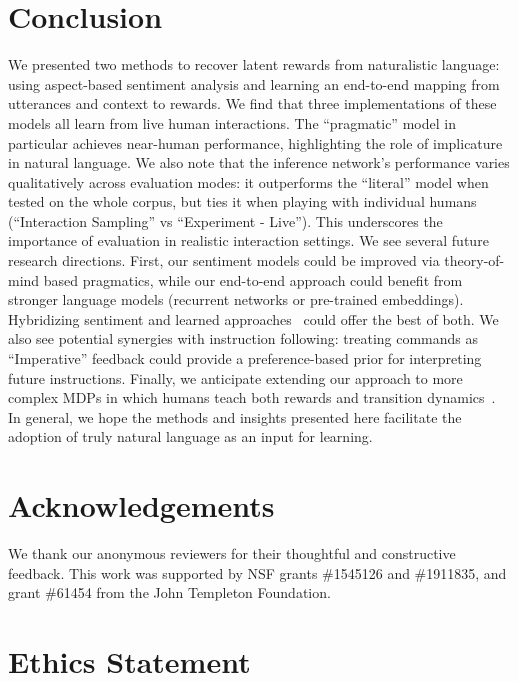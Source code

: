 \documentclass[letterpaper]{article} %
\begin{document}
\section{Conclusion}
\label{conclusion_section}
We presented two methods to recover latent rewards from naturalistic language: using aspect-based sentiment analysis and learning an end-to-end mapping from utterances and context to rewards. We find that three implementations of these models all learn from live human interactions. The ``pragmatic'' model in particular achieves near-human performance, highlighting the role of implicature in natural language. We also note that the inference network's performance varies qualitatively across evaluation modes: it outperforms the ``literal'' model when tested on the whole corpus, but ties it when playing with individual humans (``Interaction Sampling'' vs ``Experiment - Live''). This underscores the importance of evaluation in realistic interaction settings.  We see several future research directions. First, our sentiment models could be improved via theory-of-mind based pragmatics, while our end-to-end approach could benefit from stronger language models (recurrent networks or pre-trained embeddings). Hybridizing sentiment and learned approaches~\cite{jiang2011target, xu2019bertsentiment} could offer the best of both. We also see potential synergies with instruction following: treating commands as ``Imperative'' feedback could provide a preference-based prior for interpreting future instructions. Finally, we anticipate extending our approach to more complex MDPs in which humans teach both rewards and transition dynamics~\cite{narasimhan2018grounding}. In general, we hope the methods and insights presented here facilitate the adoption of truly natural language as an input for learning.



\section*{Acknowledgements}
We thank our anonymous reviewers for their thoughtful and constructive feedback. This work was supported by NSF grants \#1545126 and \#1911835, and grant \#61454 from the John Templeton Foundation.

\vspace{-3.23mm}
\section*{Ethics Statement}
\end{document}
